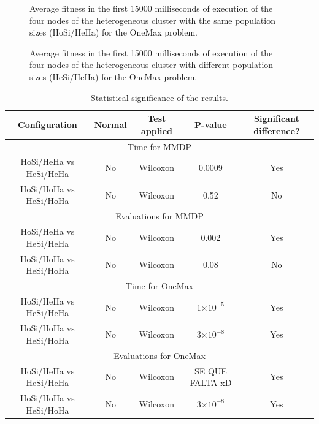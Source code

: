 \documentclass[final,1p,times]{elsarticle}
\providecommand{\e}[1]{\ensuremath{\times 10^{#1}}}
\begin{document}
\begin{figure}[htb]
\centering
{}
\caption{Average fitness in the first 15000 milliseconds of execution of the four nodes of the heterogeneous cluster with the same population sizes (HoSi/HeHa) for the OneMax problem.}
\label{fig:gensonemaxhomosize}
\end{figure}

\begin{figure}[htb]
\centering
{}
\caption{Average fitness in the first 15000 milliseconds of execution of the four nodes of the heterogeneous cluster with different population sizes (HeSi/HeHa) for the OneMax problem.}
\label{fig:gensonemaxheterosize}
\end{figure}

\begin{table}
\centering
\caption{Statistical significance of the results.}
\begin{tabular}{|c|c|c|c|c|} \hline
Configuration     &Normal &Test applied     &P-value & Significant difference?\\ \hline
\multicolumn{5}{|c|}{Time for MMDP} \\ \hline
HoSi/HeHa vs HeSi/HeHa  &No  &Wilcoxon    & 0.0009    & Yes \\ \hline
HoSi/HoHa vs HeSi/HoHa  &No   &Wilcoxon   &0.52   & No \\ \hline \hline
\multicolumn{5}{|c|}{Evaluations for MMDP}  \\ \hline
HoSi/HeHa vs HeSi/HeHa  &No  &Wilcoxon     &0.002  & Yes \\ \hline
HoSi/HoHa vs HeSi/HoHa  &No   &Wilcoxon   &0.08  & No \\ \hline \hline
\multicolumn{5}{|c|}{Time for OneMax} \\ \hline
HoSi/HeHa vs HeSi/HeHa  & No & Wilcoxon    &  1\e{-5} & Yes \\ \hline
HoSi/HoHa vs HeSi/HoHa  & No  & Wilcoxon    &  3\e{-8} & Yes \\ \hline \hline
\multicolumn{5}{|c|}{Evaluations for OneMax}  \\ \hline
HoSi/HeHa vs HeSi/HeHa  & No  & Wilcoxon    & SE QUE FALTA xD & Yes\\ \hline
HoSi/HoHa vs HeSi/HoHa  & No & Wilcoxon    & 3\e{-8}  & Yes \\ \hline

\end{tabular}
\label{tab:significance}
\end{table}
\end{document}
